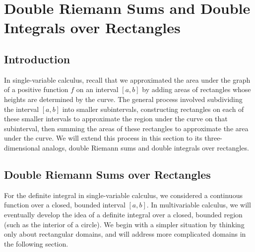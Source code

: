 \section{Double Riemann Sums and Double Integrals over Rectangles} \label{S:11.1.Double_Integrals_Rectangles}

\vspace*{-14 pt}


\subsection*{Introduction}

In single-variable calculus, recall that we approximated the area under the graph of a positive function $f$ on an interval $[a,b]$ by adding areas of rectangles whose heights are determined by the curve. The general process involved subdividing the interval $[a,b]$ into smaller subintervals, constructing rectangles on each of these smaller intervals to approximate the region under the curve on that subinterval, then summing  the areas of these rectangles to approximate the area under the curve. We will extend this process in this section to its three-dimensional analogs, double Riemann sums and double integrals over rectangles.



\subsection*{Double Riemann Sums over Rectangles}

For the definite integral in single-variable calculus, we considered a continuous function over a closed, bounded interval $[a,b]$.  In multivariable calculus, we will eventually develop the idea of a definite integral over a closed, bounded region (such as the interior of a circle).  We begin with a simpler situation by thinking only about rectangular domains, and will address more complicated domains in the following section.

